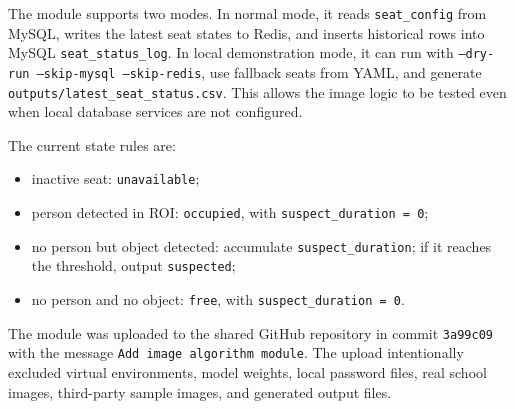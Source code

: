 The module supports two modes. In normal mode, it reads \texttt{seat\_config} from MySQL, writes the latest seat states to Redis, and inserts historical rows into MySQL \texttt{seat\_status\_log}. In local demonstration mode, it can run with \texttt{--dry-run --skip-mysql --skip-redis}, use fallback seats from YAML, and generate \texttt{outputs/latest\_seat\_status.csv}. This allows the image logic to be tested even when local database services are not configured.

The current state rules are:

\begin{itemize}
  \item inactive seat: \texttt{unavailable};
  \item person detected in ROI: \texttt{occupied}, with \texttt{suspect\_duration = 0};
  \item no person but object detected: accumulate \texttt{suspect\_duration}; if it reaches the threshold, output \texttt{suspected};
  \item no person and no object: \texttt{free}, with \texttt{suspect\_duration = 0}.
\end{itemize}

The module was uploaded to the shared GitHub repository in commit \texttt{3a99c09} with the message \texttt{Add image algorithm module}. The upload intentionally excluded virtual environments, model weights, local password files, real school images, third-party sample images, and generated output files.
